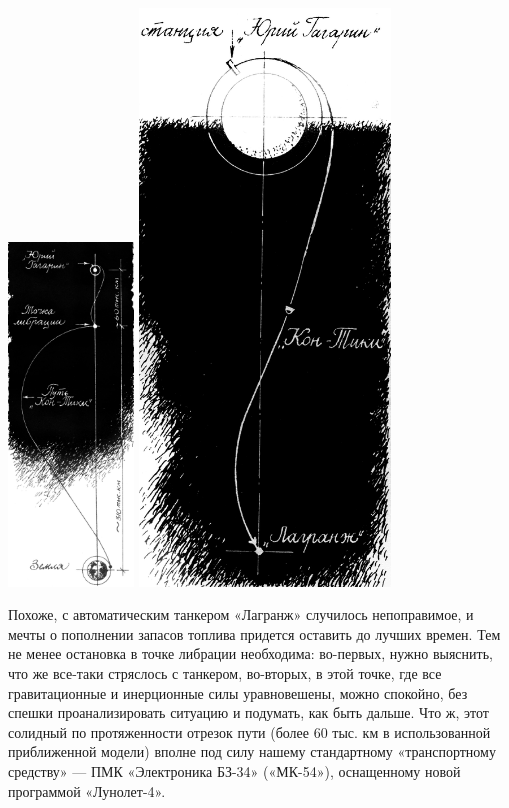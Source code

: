 \documentclass[11pt,a4paper,oneside]{article}
\begin{document}
\includegraphics[width=0.25\textwidth]{ug2}
\includegraphics[width=0.5\textwidth]{darkness2}

Похоже, с автоматическим танкером «Лагранж» случилось непоправимое, и мечты о пополнении запасов топлива придется оставить до лучших времен. Тем не менее остановка в точке либрации необходима: во-первых, нужно выяснить, что же все-таки стряслось с танкером, во-вторых, в этой точке, где все гравитационные и инерционные силы уравновешены, можно спокойно, без спешки проанализировать ситуацию и подумать, как быть дальше. Что ж, этот солидный по протяженности отрезок пути (более 60 тыс. км в использованной приближенной модели) вполне под силу нашему стандартному «транспортному средству» — ПМК «Электроника БЗ-34» («МК-54»), оснащенному новой программой «Лунолет-4».
\end{document}
